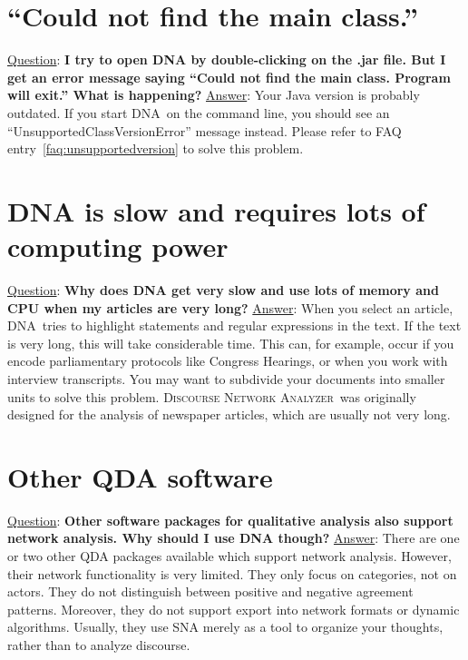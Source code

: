 \documentclass[12pt,a4paper]{scrreprt}
\newcommand{\dnalong}{\textsc{Discourse} \textsc{Network} \textsc{Analyzer}}
\newcommand{\dnashort}{\textsc{DNA}}
\begin{document}
\section{``Could not find the main class.''}\label{faq:mainclass}
\underline{Question}: \textbf{I try to open DNA by double-clicking on the .jar file. But I get an error message saying ``Could not find the main class. Program will exit.'' What is happening?}
\vspace{0.3cm} \newline
\underline{Answer}: Your Java version is probably outdated. If you start \dnashort\ on the command line, you should see an ``UnsupportedClassVersionError'' message instead. Please refer to FAQ entry~\ref{faq:unsupportedversion} to solve this problem.

\section{DNA is slow and requires lots of computing power}
\underline{Question}: \textbf{Why does DNA get very slow and use lots of memory and CPU when my articles are very long?}
\vspace{0.3cm} \newline
\underline{Answer}: When you select an article, \dnashort\ tries to highlight statements and regular expressions in the text. If the text is very long, this will take considerable time. This can, for example, occur if you encode parliamentary protocols like Congress Hearings, or when you work with interview transcripts. You may want to subdivide your documents into smaller units to solve this problem. \dnalong\ was originally designed for the analysis of newspaper articles, which are usually not very long.

\section{Other QDA software}
\underline{Question}: \textbf{Other software packages for qualitative analysis also support network analysis. Why should I use DNA though?}
\vspace{0.3cm} \newline
\underline{Answer}: There are one or two other QDA packages available which support network analysis. However, their network functionality is very limited. They only focus on categories, not on actors. They do not distinguish between positive and negative agreement patterns. Moreover, they do not support export into network formats or dynamic algorithms. Usually, they use SNA merely as a tool to organize your thoughts, rather than to analyze discourse.
\end{document}
